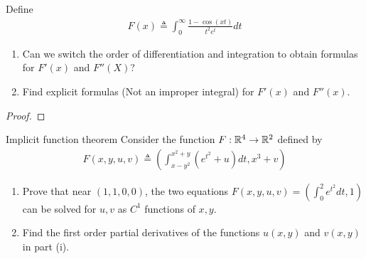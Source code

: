 \documentclass{report}
\begin{document}
\begin{question}{}{}
Define 
\begin{align*}
F(x)\triangleq \int_0^{\infty} \frac{1-\cos (xt)}{t^2e^t}dt
\end{align*}
\begin{enumerate}[label=(\roman*)]
  \item Can we switch the order of differentiation and integration to obtain formulas for $F'(x)$ and $F''(X)$? 
  \item Find explicit formulas (Not an improper integral) for $F'(x)$ and $F''(x)$.  
\end{enumerate}
\end{question}
\begin{proof}

\end{proof}
\begin{question}{Implicit function theorem}{}
Consider the function $F:\mathbb{R}^4\rightarrow \mathbb{R}^2$ defined by 
\begin{align*}
F(x,y,u,v)\triangleq \left(\int_{x-y^2}^{x^2+y}(e^{t^2}+u)dt,x^3+v \right)
\end{align*}
\begin{enumerate}[label=(\roman*)]
  \item Prove that near $(1,1,0,0)$, the two equations $F(x,y,u,v)=(\int_0^2 e^{t^2}dt,1)$ can be solved for $u,v$ as  $C^1$ functions of  $x,y$.  
  \item Find the first order partial derivatives of the functions $u(x,y)$ and $v(x,y)$ in part (i). 
\end{enumerate}
\end{question}
\end{document}
